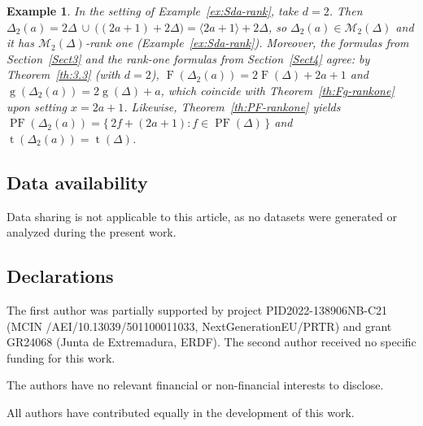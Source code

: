 \documentclass[12pt,a4paper]{amsart}
\newtheorem{example}[theorem]{Example}
\theoremstyle{definition}
\theoremstyle{remark}
\begin{document}
\begin{example}
In the setting of Example~\ref{ex:Sda-rank}, take $d=2$. Then $
\Delta_2(a)=2\Delta\ \cup\ \bigl((2a+1)+2\Delta\bigr)=\langle 2a+1\rangle+2\Delta$, so $\Delta_2(a)\in\mathcal{M}_2(\Delta)$ and it has $\mathcal{M}_2(\Delta)$-rank one (Example~\ref{ex:Sda-rank}).
Moreover, the formulas from Section~\ref{Sect3} and the rank-one formulas from Section~\ref{Sect4} agree:
by Theorem~\ref{th:3.3} (with $d=2$), $
\operatorname{F}(\Delta_2(a))=2\operatorname{F}(\Delta)+2a+1$ and $\operatorname{g}(\Delta_2(a))=2\operatorname{g}(\Delta)+a$,
which coincide with Theorem~\ref{th:Fg-rankone} upon setting $x=2a+1$. Likewise, Theorem~\ref{th:PF-rankone} yields
$\operatorname{PF}(\Delta_2(a))=\{\,2f+(2a+1): f\in \operatorname{PF}(\Delta)\,\}$ and $\operatorname{t}(\Delta_2(a))=\operatorname{t}(\Delta)$.
\end{example}

\subsection*{Data availability}\mbox{}\par
\noindent Data sharing is not applicable to this article, as no datasets were generated or analyzed during the present work.

\subsection*{Declarations}\mbox{}\par 
\noindent The first author was partially supported by project PID2022-138906NB-C21 (MCIN /AEI/10.13039/501100011033, NextGenerationEU/PRTR) and grant GR24068 (Junta de Extre\-madura, ERDF). The second author received no specific funding for this work.

\medskip
\noindent The authors have no relevant financial or non-financial interests to disclose.

\medskip
\noindent
All authors have contributed equally in the development of this work.
\end{document}
